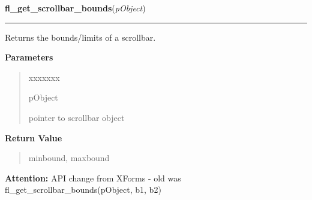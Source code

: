 \hspace{.8\funcindent}\begin{boxedminipage}{\funcwidth}

    \raggedright \textbf{fl\_get\_scrollbar\_bounds}(\textit{pObject})

    \vspace{-1.5ex}

    \rule{\textwidth}{0.5\fboxrule}
\setlength{\parskip}{2ex}
    Returns the bounds/limits of a scrollbar.

\setlength{\parskip}{1ex}
      \textbf{Parameters}
      \vspace{-1ex}

      \begin{quote}
        \begin{Ventry}{xxxxxxx}

          \item[pObject]

          pointer to scrollbar object

        \end{Ventry}

      \end{quote}

      \textbf{Return Value}
    \vspace{-1ex}

      \begin{quote}
      minbound, maxbound

      \end{quote}

\textbf{Attention:} API change from XForms - old was fl\_get\_scrollbar\_bounds(pObject, b1, 
b2)



    \end{boxedminipage}

    \label{xformslib:library:fl_set_scrollbar_return}

    \vspace{0.5ex}

